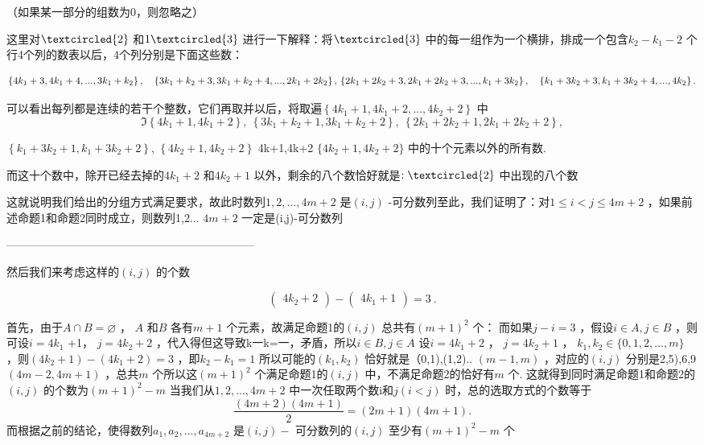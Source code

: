 \begin{question}
{（如果某一部分的组数为0，则忽略之）

这里对$\textcircled{2}$ 和$1\textcircled{3}$ 进行一下解释：将$\textcircled{3}$ 中的每一组作为一个横排，排成一个包含$k_{2}-k_{1}-2$ 个行4个列的数表以后，4个列分别是下面这些数：

$$\left\{4k_{1}+3,4k_{1}+4,...,3k_{1}+k_{2}\right\},\quad\left\{3k_{1}+k_{2}+3,3k_{1}+k_{2}+4,...,2k_{1}+2k_{2}\right\},\\\left\{2k_{1}+2k_{2}+3,2k_{1}+2k_{2}+3,...,k_{1}+3k_{2}\right\},\quad\left\{k_{1}+3k_{2}+3,k_{1}+3k_{2}+4,...,4k_{2}\right\}.$$

可以看出每列都是连续的若干个整数，它们再取并以后，将取遍$\left\{4k_{1}+1,4k_{1}+2,...,4k_{2}+2\right\}$ 中
$$\Im\left\{4k_{1}+1,4k_{1}+2\right\},\:\left\{3k_{1}+k_{2}+1,3k_{1}+k_{2}+2\right\},\:\left\{2k_{1}+2k_{2}+1,2k_{1}+2k_{2}+2\right\},$$

$\left \{ k_{1}+ 3k_{2}+ 1, k_{1}+ 3k_{2}+ 2\right \}$, $\left \{ 4k_{2}+ 1, 4k_{2}+ 2\right \}$ {4k+1,4k+2} $\{4k_{2}+1,4k_{2}+2\}$ 中的十个元素以外的所有数.

而这十个数中，除开已经去掉的$4k_{1}+2$ 和$4k_2+1$ 以外，剩余的八个数恰好就是$:\textcircled{2}$ 中出现的八个数

这就说明我们给出的分组方式满足要求，故此时数列$1,2,...,4m+2$ 是$(i,j)$ -可分数列至此，我们证明了：对$1\leq i<j\leq4m+2$ ，如果前述命题1和命题2同时成立，则数列1,2... $4m+2$ 一定是(i,j)-可分数列

------------------------------------------------------------------

然后我们来考虑这样的$(i,j)$ 的个数

$$\begin{pmatrix}4k_2+2\end{pmatrix}-\begin{pmatrix}4k_1+1\end{pmatrix}=3\:.$$

首先，由于$A\cap B=\varnothing$ ， $A$ 和$B$ 各有$m+1$ 个元素，故满足命题1的$(i,j)$ 总共有$\left(m+1\right)^2$ 个： 而如果$j-i=3$ ，假设$i\in A,j\in B$ ，则可设$i=4k_{1}$ +1， $j=4k_{2}+2$ ，代入得但这导致k一k=一，矛盾，所以$i\in B,j\in A$ 设$i=4k_{1}+2$ ， $j=4k_{2}+1$ ， $k_1,k_2\in\{0,1,2,...,m\}$ ，则$\left(4k_{2}+1\right)-\left(4k_{1}+2\right)=3$ ，即$k_2-k_1=1$ 所以可能的$(k_1,k_2)$ 恰好就是（0,1),(1,2).. $(m-1,m)$ ，对应的$(i,j)$ 分别是2,5),6,9 $\left(4m-2,4m+1\right)$ ，总共$m$ 个所以这$\left(m+1\right)^2$ 个满足命题1的$(i,j)$ 中，不满足命题2的恰好有$m$ 个. 这就得到同时满足命题1和命题2的$(i,j)$ 的个数为$\left(m+1\right)^{2}-m$ 当我们从$1,2,...,4m+2$ 中一次任取两个数i和$j(i<j)$ 时，总的选取方式的个数等于
$$\frac{\left(4m+2\right)\left(4m+1\right)}{2}=\left(2m+1\right)\left(4m+1\right).$$
而根据之前的结论，使得数列$a_{1},a_{2},...,a_{4m+2}$ 是$(i,j)-$ 可分数列的$(i,j)$ 至少有$\left(m+1\right)^2-m$ 个

}
\end{question}
